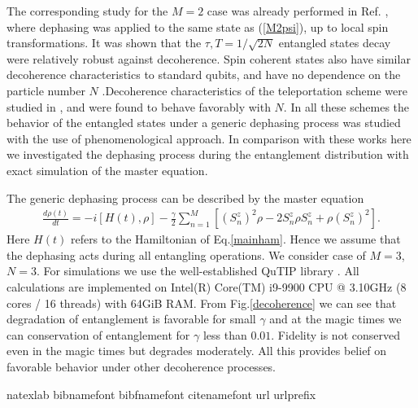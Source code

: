 \documentclass[%
  prx,%
  twocolumn,%
  preprintnumbers,%
  amsmath,%
  amssymb,%
  superscriptaddress%
]{revtex4}
\begin{document}
{The corresponding study for the $M = 2$ case was already performed in Ref. \cite{byrnes2013fractality}, where dephasing was applied to the same state as (\ref{M2psi}), up to local spin transformations. It was shown that the $ \tau,T = 1/\sqrt{2N} $ entangled states decay were relatively robust against decoherence. Spin coherent states also have similar decoherence characteristics to standard qubits, and have no dependence on the particle number $ N $ \cite{byrnes2012macroscopic}.Decoherence characteristics of the teleportation scheme were studied in \cite{pyrkov2014quantum,pyrkov2014full}, and were found to behave favorably with $ N $. In all these schemes the behavior of the entangled states under a generic dephasing process was studied with the use of phenomenological approach. In comparison with these works here we investigated the dephasing process during the entanglement distribution with exact simulation of the master equation.


The generic dephasing process can be described by the master equation
%
\begin{align}
\frac{d \rho(t)}{dt} = -i [H(t), \rho] - \frac{\gamma}{2} \sum_{n=1}^M \left[ (S^z_n)^2 \rho
-2 S^z_n \rho S^z_n + \rho  (S^z_n)^2 \right] .
\label{dephasingmaster}
\end{align}
%
Here $ H(t) $ refers to the Hamiltonian of  Eq.\ref{mainham}.   Hence we assume that the dephasing acts during all entangling operations. We consider case of $M=3$, $N=3$. For simulations we use the well-established QuTIP library \cite{qutip}. All calculations are implemented on Intel(R) Core(TM) i9-9900 CPU @ 3.10GHz (8 cores / 16 threads) with 64GiB RAM. From Fig.\ref{decoherence} we can see that degradation of entanglement is favorable for small $\gamma$ and at  the magic times we can conservation of entanglement for $\gamma$ less than $0.01$. Fidelity is not conserved even in the magic times but degrades moderately. All this provides belief on favorable behavior under other decoherence processes.















% 
%


\begin{thebibliography}{99}
\expandafter\ifx\csname natexlab\endcsname\relax\def\natexlab#1{#1}\fi
\expandafter\ifx\csname bibnamefont\endcsname\relax
  \def\bibnamefont#1{#1}\fi
\expandafter\ifx\csname bibfnamefont\endcsname\relax
  \def\bibfnamefont#1{#1}\fi
\expandafter\ifx\csname citenamefont\endcsname\relax
  \def\citenamefont#1{#1}\fi
\expandafter\ifx\csname url\endcsname\relax
  \def\url#1{\texttt{#1}}\fi
\expandafter\ifx\csname urlprefix\endcsname\relax\def\urlprefix{URL }\fi
\providecommand{\bibinfo}[2]{#2}
\providecommand{\eprint}[2][]{\url{#2}}


\end{thebibliography}}
\end{document}

